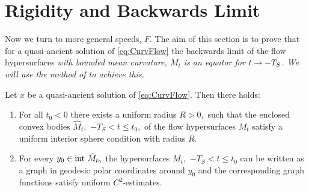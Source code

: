 \documentclass{amsart}
\begin{document}
\section{Rigidity and Backwards Limit}

Now we turn to more general speeds, \(F\). The aim of this section is to prove that for a quasi-ancient solution of \eqref{eq:CurvFlow} the backwards limit of the flow hypersurfaces \it{with bounded mean curvature}, $M_t$ is an equator for $t\rightarrow -T_S$. We will use the method of \cite{MakowskiScheuer:/2013} to achieve this.

\begin{lemma}\label{ISC}
Let $x$ be a quasi-ancient solution of \eqref{eq:CurvFlow}. Then there holds:
\begin{enumerate}
  \item For all $t_0<0$ there exists a uniform radius $R>0,$ such that the enclosed convex bodies $\hat{M}_t,$ $-T_S<t\leq t_0,$ of the flow hypersurfaces $M_t$ satisfy a uniform interior sphere condition with radius $R.$
  \item For every $y_0\in\mathrm{int}~\hat{M}_{t_0}$ the hypersurfaces $M_t,$ $-T_S<t\leq t_0$ can be written as a graph in geodesic polar coordinates around $y_0$ and the corresponding graph functions satisfy uniform $C^2$-estimates.
\end{enumerate}
\end{lemma}
\end{document}

